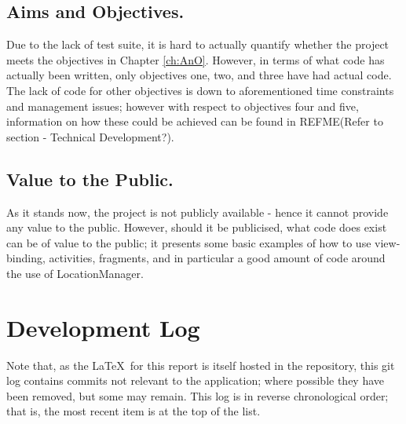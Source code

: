 \documentclass[11pt, a4paper, notitlepage]{report}
\begin{document}
\section{Aims and Objectives.}
Due to the lack of test suite, it is hard to actually quantify whether the project meets the objectives in Chapter \ref{ch:AnO}. However, in terms of what code has actually been written, only objectives one, two, and three have had actual code. The lack of code for other objectives is down to aforementioned time constraints and management issues; however with respect to objectives four and five, information on how these could be achieved can be found in REFME(Refer to section - Technical Development?).

\section{Value to the Public.}
As it stands now, the project is not publicly available - hence it cannot provide any value to the public. However, should it be publicised, what code does exist can be of value to the public; it presents some basic examples of how to use view-binding, activities, fragments, and in particular a good amount of code around the use of LocationManager.

\appendix
\chapter{Development Log}\label{app:GitLog}
Note that, as the \LaTeX\ for this report is itself hosted in the repository, this git log contains commits not relevant to the application; where possible they have been removed, but some may remain.
This log is in reverse chronological order; that is, the most recent item is at the top of the list.
\end{document}
